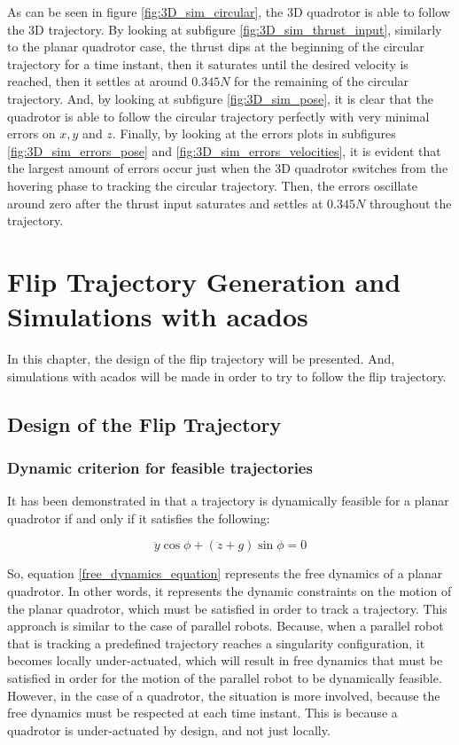 \documentclass{thesisreport}
\begin{document}
\newpage 

As can be seen in figure \ref{fig:3D_sim_circular}, the 3D quadrotor is able to follow the 3D trajectory. By looking at subfigure \ref{fig:3D_sim_thrust_input}, similarly to the planar quadrotor case, the thrust dips at the beginning of the circular trajectory for a time instant, then it saturates until the desired velocity is reached, then it settles at around $0.345N$ for the remaining of the circular trajectory. And, by looking at subfigure \ref{fig:3D_sim_pose}, it is clear that the quadrotor is able to follow the circular trajectory perfectly with very minimal errors on $x,y$ and $z$. Finally, by looking at the errors plots in subfigures \ref{fig:3D_sim_errors_pose} and \ref{fig:3D_sim_errors_velocities}, it is evident that the largest amount of errors occur just when the 3D quadrotor switches from the hovering phase to tracking the circular trajectory. Then, the errors oscillate around zero after the thrust input saturates and settles at $0.345N$ throughout the trajectory.

\newpage

\chapter{Flip Trajectory Generation and Simulations with acados}
In this chapter, the design of the flip trajectory will be presented. And, simulations with acados will be made in order to try to follow the flip trajectory.

\section{Design of the Flip Trajectory}

\subsection{Dynamic criterion for feasible trajectories}

	It has been demonstrated in \cite{Orsingher2019} that a trajectory is dynamically feasible for a planar quadrotor if and only if it satisfies the following:
	
	\begin{equation}\label{free_dynamics_equation}
	\ddot{y} \cos \phi + (\ddot{z} + g) \sin \phi = 0
	\end{equation}

So, equation \ref{free_dynamics_equation} represents the free dynamics of a planar quadrotor. In other words, it represents the dynamic constraints on the motion of the planar quadrotor, which must be satisfied in order to track a trajectory. This approach is similar to the case of parallel robots. Because, when a parallel robot that is tracking a predefined trajectory reaches a singularity configuration, it becomes locally under-actuated, which will result in free dynamics that must be satisfied in order for the motion of the parallel robot to be dynamically feasible. However, in the case of a quadrotor, the situation is more involved, because the free dynamics must be respected at each time instant. This is because a quadrotor is under-actuated by design, and not just locally. 
\end{document}
